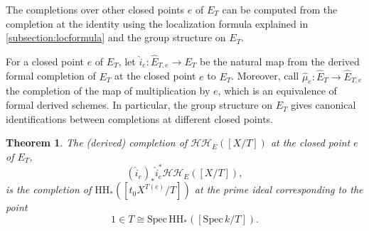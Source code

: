\documentclass[11pt,letterpaper]{amsart}
\newtheorem{theorem}[dummy]{Theorem}
\newcommand{\cHH}{\mathcal{HH}}
\newcommand{\Spec}{\mathrm{S}\mathrm{pec}\,}
\begin{document}
The completions over other closed points $e$ of $E_T$ can be computed from the completion at the identity using the localization formula explained in \ref{subsection:locformula} and the group structure on $E_T$. 

For a closed point $e$ of $E_T$, let $\widehat{i}_e:\widehat{E}_{T,e}\rightarrow E_T$ be the natural map from the derived formal completion of $E_T$ at the closed point $e$ to $E_T$. Moreover, call $\widehat{\mu}_e:\widehat{E}_T\rightarrow\widehat{E}_{T,e}$ the completion of the map of multiplication by $e$, which is an equivalence of formal derived schemes. In particular, the group structure on $E_T$ gives canonical identifications between completions at different closed points.

\begin{theorem}\label{theorem:completionsgeneral}
The (derived) completion of $\cHH_E([X/T])$ at the closed point $e$ of $E_T$, 
$$(\widehat{i}_e)_\ast\widehat{i}_e^\ast \cHH_E([X/T]),$$ is the completion of $\mathrm{HH}_\ast([t_0 X^{T(e)}/T])$ at the prime ideal corresponding to the point 
$$1\in T \cong \Spec \mathrm{HH}_\ast([\Spec k/T]).$$
\end{theorem}
\end{document}
